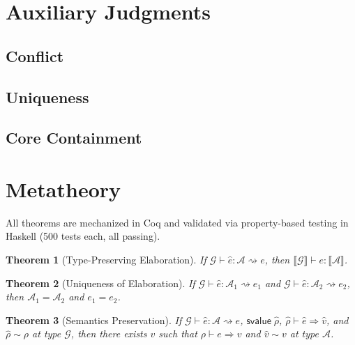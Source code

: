 \documentclass{article}
\newtheorem{theorem}{Theorem}[section]
\newcommand{\lsem}{\llbracket}
\newcommand{\rsem}{\rrbracket}
\newcommand{\kw}[1]{\mathsf{#1}}
\newcommand{\shat}[1]{\hat{#1}}
\newcommand{\elmark}{\rightsquigarrow}
\newcommand{\sval}{\kw{svalue}}
\begin{document}
\section{Auxiliary Judgments}

\subsection{Conflict}
\ottdefncfl{}

\subsection{Uniqueness}
\ottdefnuq{}

\subsection{Core Containment}
\ottdefnctm{}


\section{Metatheory}

All theorems are mechanized in Coq and validated via property-based
testing in Haskell (500 tests each, all passing).

\begin{theorem}[Type-Preserving Elaboration]
If\; $\mathcal{G} \vdash \shat{e} : \mathcal{A} \elmark e$,
then $\lsem \mathcal{G} \rsem \vdash e : \lsem \mathcal{A} \rsem$.
\end{theorem}

\begin{theorem}[Uniqueness of Elaboration]
If\; $\mathcal{G} \vdash \shat{e} : \mathcal{A}_1 \elmark e_1$
and  $\mathcal{G} \vdash \shat{e} : \mathcal{A}_2 \elmark e_2$,
then $\mathcal{A}_1 = \mathcal{A}_2$ and $e_1 = e_2$.
\end{theorem}

\begin{theorem}[Semantics Preservation]
If\; $\mathcal{G} \vdash \shat{e} : \mathcal{A} \elmark e$,
$\sval\;\hat{\rho}$,
$\hat{\rho} \vdash \shat{e} \Rightarrow \shat{v}$,
and $\hat{\rho} \sim \rho$ at type $\mathcal{G}$,
then there exists $v$ such that
$\rho \vdash e \Rightarrow v$
and $\shat{v} \sim v$ at type $\mathcal{A}$.
\end{theorem}
\end{document}
